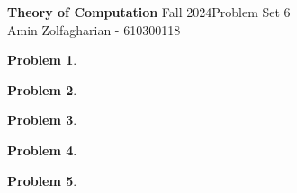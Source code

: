 \documentclass[12pt]{article}
\newcommand{\customanswer}[1]{%
\begin{problem}
\end{problem}

}
\newtheorem{problem}{Problem}
\begin{document}
\noindent \textbf{Theory of Computation} Fall 2024\hfill Problem Set 6\\
Amin Zolfagharian - 610300118

\hrulefill

\customanswer{1}
\newpage
\customanswer{2}
\customanswer{3}
\customanswer{4}
\customanswer{5}
\end{document}
